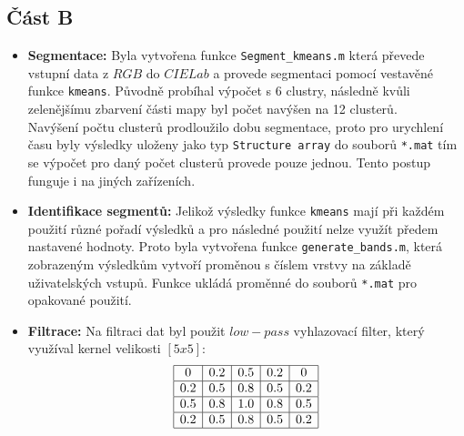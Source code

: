\subsection*{Část B}
\begin{itemize}
    \item \textbf{Segmentace:}
    Byla vytvořena funkce \texttt{Segment\_kmeans.m} která převede vstupní data z $RGB$ do $CIE Lab$ a provede segmentaci pomocí vestavěné funkce \texttt{kmeans}. Původně probíhal výpočet s 6 clustry, následně kvůli zelenějšímu zbarvení části mapy byl počet navýšen na 12 clusterů. \\ 
    Navýšení počtu clusterů prodloužilo dobu segmentace, proto pro urychlení času byly výsledky uloženy jako typ \texttt{Structure array} do souborů \texttt{*.mat} tím se výpočet pro daný počet clusterů provede pouze jednou. Tento postup funguje i na jiných zařízeních. 
    \item \textbf{Identifikace segmentů:}
    Jelikož výsledky funkce \texttt{kmeans} mají při každém použití různé pořadí výsledků a pro následné použití nelze využít předem nastavené hodnoty. Proto byla vytvořena funkce \texttt{generate\_bands.m}, která zobrazeným výsledkům vytvoří proměnou s číslem vrstvy na základě uživatelských vstupů. Funkce ukládá proměnné do souborů \texttt{*.mat} pro opakované použití.
    \item \textbf{Filtrace:}
    Na filtraci dat byl použit $low-pass$ vyhlazovací filter, který využíval kernel velikosti $[5x5]$:\\
    \renewcommand{\arraystretch}{2}
    \setlength{\tabcolsep}{7pt}
    \[
    \begin{array}{|c|c|c|c|c|}
        \hline
        0 & 0.2 & 0.5 & 0.2 & 0 \\
        \hline
        0.2 & 0.5 & 0.8 & 0.5 & 0.2 \\
        \hline
        0.5 & 0.8 & 1.0 & 0.8 & 0.5 \\
        \hline
        0.2 & 0.5 & 0.8 & 0.5 & 0.2 \\
        \hline

\end{array}\]
\end{itemize}
